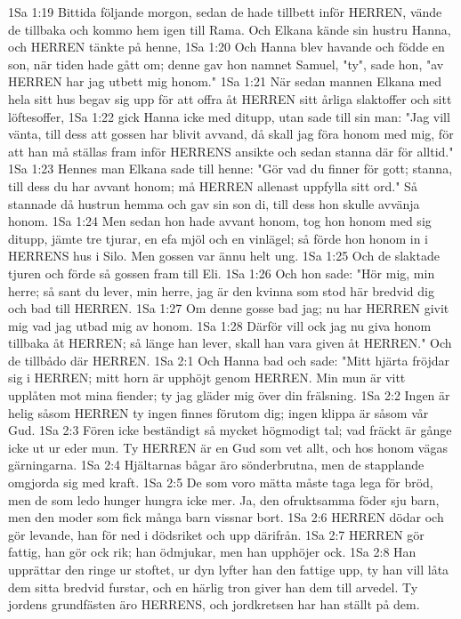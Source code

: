 1Sa 1:19  Bittida följande morgon, sedan de hade tillbett inför HERREN, vände de tillbaka och kommo hem igen till Rama. Och Elkana kände sin hustru Hanna, och HERREN tänkte på henne,
1Sa 1:20  Och Hanna blev havande och födde en son, när tiden hade gått om; denne gav hon namnet Samuel, "ty", sade hon, "av HERREN har jag utbett mig honom."
1Sa 1:21  När sedan mannen Elkana med hela sitt hus begav sig upp för att offra åt HERREN sitt årliga slaktoffer och sitt löftesoffer,
1Sa 1:22  gick Hanna icke med ditupp, utan sade till sin man: "Jag vill vänta, till dess att gossen har blivit avvand, då skall jag föra honom med mig, för att han må ställas fram inför HERRENS ansikte och sedan stanna där för alltid."
1Sa 1:23  Hennes man Elkana sade till henne: "Gör vad du finner för gott; stanna, till dess du har avvant honom; må HERREN allenast uppfylla sitt ord." Så stannade då hustrun hemma och gav sin son di, till dess hon skulle avvänja honom.
1Sa 1:24  Men sedan hon hade avvant honom, tog hon honom med sig ditupp, jämte tre tjurar, en efa mjöl och en vinlägel; så förde hon honom in i HERRENS hus i Silo. Men gossen var ännu helt ung.
1Sa 1:25  Och de slaktade tjuren och förde så gossen fram till Eli.
1Sa 1:26  Och hon sade: "Hör mig, min herre; så sant du lever, min herre, jag är den kvinna som stod här bredvid dig och bad till HERREN.
1Sa 1:27  Om denne gosse bad jag; nu har HERREN givit mig vad jag utbad mig av honom.
1Sa 1:28  Därför vill ock jag nu giva honom tillbaka åt HERREN; så länge han lever, skall han vara given åt HERREN." Och de tillbådo där HERREN.
1Sa 2:1  Och Hanna bad och sade: "Mitt hjärta fröjdar sig i HERREN; mitt horn är upphöjt genom HERREN. Min mun är vitt upplåten mot mina fiender; ty jag gläder mig över din frälsning.
1Sa 2:2  Ingen är helig såsom HERREN ty ingen finnes förutom dig; ingen klippa är såsom vår Gud.
1Sa 2:3  Fören icke beständigt så mycket högmodigt tal; vad fräckt är gånge icke ut ur eder mun. Ty HERREN är en Gud som vet allt, och hos honom vägas gärningarna.
1Sa 2:4  Hjältarnas bågar äro sönderbrutna, men de stapplande omgjorda sig med kraft.
1Sa 2:5  De som voro mätta måste taga lega för bröd, men de som ledo hunger hungra icke mer. Ja, den ofruktsamma föder sju barn, men den moder som fick många barn vissnar bort.
1Sa 2:6  HERREN dödar och gör levande, han för ned i dödsriket och upp därifrån.
1Sa 2:7  HERREN gör fattig, han gör ock rik; han ödmjukar, men han upphöjer ock.
1Sa 2:8  Han upprättar den ringe ur stoftet, ur dyn lyfter han den fattige upp, ty han vill låta dem sitta bredvid furstar, och en härlig tron giver han dem till arvedel. Ty jordens grundfästen äro HERRENS, och jordkretsen har han ställt på dem.
